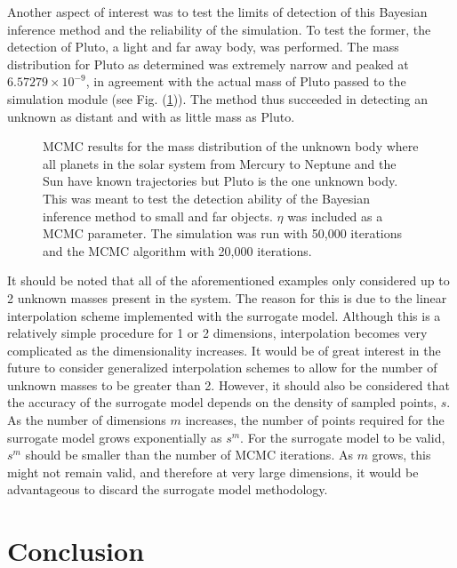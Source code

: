 \documentclass[twocolumn]{aastex63}
\begin{document}
Another aspect of interest was to test the limits of detection of this Bayesian inference method and the reliability of the simulation. To test the former, the detection of Pluto, a light and far away body, was performed. The mass distribution for Pluto as determined was extremely narrow and peaked at $6.57279\times10^{-9}$, in agreement with the actual mass of Pluto passed to the simulation module (see Fig. (\ref{fig:pluto_eta})). The method thus succeeded in detecting an unknown as distant and with as little mass as Pluto. 


\begin{figure}[ht!]
\caption{MCMC results for the mass distribution of the unknown body where all planets in the solar system from Mercury to Neptune and the Sun have known trajectories but Pluto is the one unknown body. This was meant to test the detection ability of the Bayesian inference method to small and far objects. $\eta$ was included as a MCMC parameter. The simulation was run with 50,000 iterations and the MCMC algorithm with 20,000 iterations.\label{fig:pluto_eta}}
\end{figure}

It should be noted that all of the aforementioned examples only considered up to 2 unknown masses present in the system. The reason for this is due to the linear interpolation scheme implemented with the surrogate model. Although this is a relatively simple procedure for 1 or 2 dimensions, interpolation becomes very complicated as the dimensionality increases. It would be of great interest in the future to consider generalized interpolation schemes to allow for the number of unknown masses to be greater than 2. However, it should also be considered that the accuracy of the surrogate model depends on the density of sampled points, $s$. As the number of dimensions $m$ increases, the number of points required for the surrogate model grows exponentially as $s^m$. For the surrogate model to be valid, $s^m$ should be smaller than the number of MCMC iterations. As $m$ grows, this might not remain valid, and therefore at very large dimensions, it would be advantageous to discard the surrogate model methodology.

\section{Conclusion}
\end{document}
